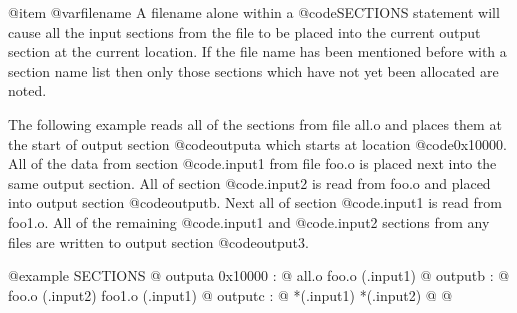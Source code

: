 @item @var{filename}
A filename alone within a @code{SECTIONS} statement will cause all the
input sections from the file to be placed into the current output
section at the current location. If the file name has been mentioned
before with a section name list then only those
sections which have not yet been allocated are noted. 

The following example reads all of the sections from file all.o and
places them at the start of output section @code{outputa} which starts
at location @code{0x10000}. All of the data from section @code{.input1} from
file foo.o is placed next into the same output section.  All of
section @code{.input2} is read from foo.o and placed into output
section @code{outputb}.  Next all of section @code{.input1} is read
from foo1.o. All of the remaining @code{.input1} and @code{.input2}
sections from any files are written to output section @code{output3}.

@example
       SECTIONS        
              @{
                outputa 0x10000 :
                        @{
                        all.o
                        foo.o (.input1)
                        @}
                outputb :
                        @{
                        foo.o (.input2)
                        foo1.o (.input1)
                        @}
                outputc :
                        @{
                        *(.input1)
                        *(.input2)
                        @}
                @}

